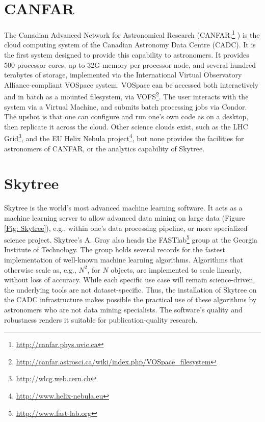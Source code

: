 \documentclass[11pt,twoside]{article}
\begin{document}
\section{CANFAR} \label{Sec: CANFAR}

The Canadian Advanced Network for Astronomical Research (CANFAR;\footnote{\url{http://canfar.phys.uvic.ca}} \citeauthor{gaudet:canfar} \citeyear{gaudet:canfar}) is the cloud computing system of the Canadian Astronomy Data Centre (CADC). It is the first system designed to provide this capability to astronomers. It provides 500 processor cores, up to 32G memory per processor node, and several hundred terabytes of storage, implemented via the International Virtual Observatory Alliance-compliant VOSpace system. VOSpace can be accessed both interactively and in batch as a mounted filesystem, via VOFS\footnote{\url{http://canfar.astrosci.ca/wiki/index.php/VOSpace_filesystem}}. The user interacts with the system via a Virtual Machine, and submits batch processing jobs via Condor. The upshot is that one can configure and run one's own code as on a desktop, then replicate it across the cloud. Other science clouds exist, such as the LHC Grid\footnote{\url{http://wlcg.web.cern.ch}}, and the EU Helix Nebula project\footnote{\url{http://www.helix-nebula.eu}}, but none provides the facilities for astronomers of CANFAR, or the analytics capability of Skytree.

\section{Skytree} \label{Sec: Skytree}

Skytree is the world's most advanced machine learning software. It acts as a machine learning server to allow advanced data mining on large data (Figure \ref{Fig: Skytree}), e.g., within one's data processing pipeline, or more specialized science project. Skytree's A. Gray also heads the FASTlab\footnote{\url{http://www.fast-lab.org}} group at the Georgia Institute of Technology. The group holds several records for the fastest implementation of well-known machine learning algorithms. Algorithms that otherwise scale as, e.g., $N^2$, for $N$ objects, are implemented to scale linearly, without loss of accuracy. While each specific use case will remain science-driven, the underlying tools are not dataset-specific. Thus, the installation of Skytree on the CADC infrastructure makes possible the practical use of these algorithms by astronomers who are not data mining specialists. The software's quality and robustness renders it suitable for publication-quality research.
\end{document}
